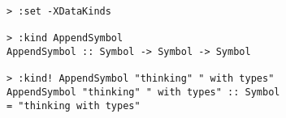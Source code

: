 \begin{repl}\begin{lstlisting}
> :set -XDataKinds

> :kind AppendSymbol
AppendSymbol :: Symbol -> Symbol -> Symbol

> :kind! AppendSymbol "thinking" " with types"
AppendSymbol "thinking" " with types" :: Symbol
= "thinking with types"\end{lstlisting}\end{repl}
